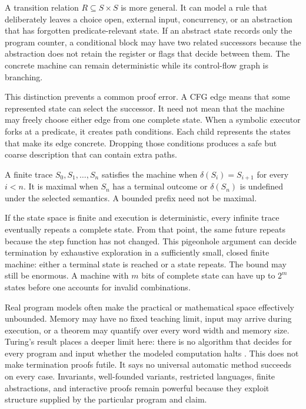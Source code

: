 A transition relation \(R\subseteq S\times S\) is more general. It can model
a rule that deliberately leaves a choice open, external input, concurrency,
or an abstraction that has
forgotten predicate-relevant state. If an abstract state records only the
program counter, a conditional block may have two related successors because
the abstraction does not retain the register or flags that decide between
them. The concrete machine can remain deterministic while its control-flow
graph is branching.

This distinction prevents a common proof error. A CFG edge means that some
represented state can select the successor. It need not mean that the machine
may freely choose either edge from one complete state. When a symbolic executor
forks at a predicate, it creates path conditions. Each child represents the
states that make its edge concrete. Dropping those conditions produces a safe
but coarse description that can contain extra paths.

\begin{definition}[title={Trace under a partial deterministic step}]
A finite trace \(S_0,S_1,\ldots,S_n\) satisfies the machine when
\(\delta(S_i)=S_{i+1}\) for every \(i<n\). It is maximal when \(S_n\) has a
terminal outcome or \(\delta(S_n)\) is undefined under the selected semantics.
A bounded prefix need not be maximal.
\end{definition}

If the state space is finite and execution is deterministic, every infinite
trace eventually repeats a complete state. From that point, the same future
repeats because the step function has not changed. This pigeonhole argument
can decide termination by exhaustive exploration in a sufficiently small,
closed finite machine: either a terminal state is reached or a state repeats.
The bound may still be enormous. A machine with \(m\) bits of complete state
can have up to \(2^m\) states before one accounts for invalid combinations.

Real program models often make the practical or mathematical space effectively
unbounded. Memory may have no fixed teaching limit, input may arrive during
execution, or a theorem may quantify over every word width and memory size.
Turing's result places a deeper limit here: there is no algorithm that decides
for every program and input whether the modeled computation halts
\autocite{turing1936computable}. This does not make termination proofs futile.
It says no universal automatic method succeeds on every case. Invariants,
well-founded variants, restricted languages, finite abstractions, and
interactive proofs remain powerful because they exploit structure supplied by
the particular program and claim.

